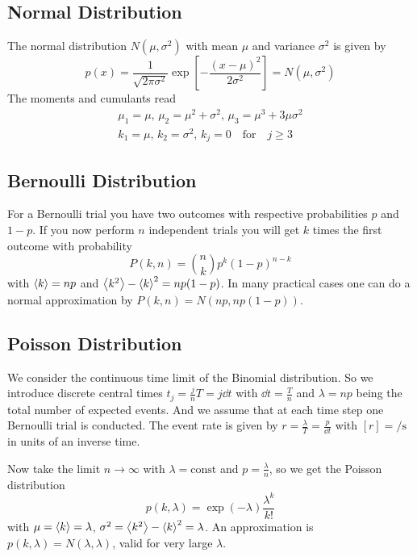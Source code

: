\documentclass{/home/ben/Templates/notebook}
\begin{document}
	\subsection*{Normal Distribution}
	
	The normal distribution $N(\mu, \sigma^2)$ with mean $\mu$ and variance $\sigma^2$ is given by
	\begin{equation}
	p(x) = \frac{1}{\sqrt{2 \pi \sigma^2}} \exp[- \frac{(x- \mu)^2}{2 \sigma^2}] = N(\mu, \sigma^2)
	\end{equation}
	The moments and cumulants read
	\begin{gather*}
		\mu_1 = \mu, \, \mu_2 = \mu^2 + \sigma^2, \, \mu_3 = \mu^3 + 3 \mu \sigma^2 \\
		k_1 = \mu, \, k_2 = \sigma^2, \, k_j = 0 \quad \mathrm{for} \quad j \geq 3
	\end{gather*}
	
	\subsection*{Bernoulli Distribution}
	
	For a Bernoulli trial you have two outcomes with respective probabilities $p$ and $1 - p$. If you now perform $n$ independent trials you will get $k$ times the first outcome with probability
	\begin{equation}
	P(k,n) = \binom{n}{k} p^k (1 - p)^{n - k}
	\end{equation}
	with $\expval{k} = n p$ and $\expval{k^2} - \expval{k}^2 = n p (1 - p)$. In many practical cases one can do a normal approximation by $P(k,n) = N(np, n p (1 - p))$.
	
	\subsection*{Poisson Distribution}
	
	We consider the continuous time limit of the Binomial distribution. So we introduce discrete central times $t_j = \frac{j}{n} T = j \dd{t}$ with $\dd{t} = \frac{T}{n}$ and $\lambda = np$ being the total number of expected events. And we assume that at each time step one Bernoulli trial is conducted. The event rate is given by $r = \frac{\lambda}{T} = \frac{p}{\dd{t}}$ with $[r] = \si{\per \second}$ in units of an inverse time. 
	
	Now take the limit $n \to \infty$ with $\lambda = \mathrm{const}$ and $p = \frac{\lambda}{n}$, so we get the Poisson distribution
	\begin{equation}
	p(k,\lambda) = \exp(-\lambda) \frac{\lambda^k}{k!}
	\end{equation}
	with $\mu = \expval{k} = \lambda$, $\sigma^2 = \expval{k^2} - \expval{k}^2 = \lambda$. An approximation is $p(k,\lambda) = N(\lambda, \lambda)$, valid for very large $\lambda$.
	
\end{document}
